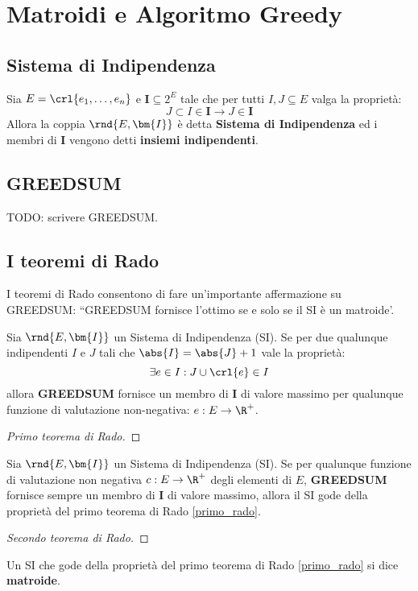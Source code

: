 \documentclass[\main/main.tex]{subfiles}
\begin{document}
\chapter{Matroidi e Algoritmo Greedy}
\section{Sistema di Indipendenza}
\begin{definition}
  Sia \(E = \crl{e_1, \ldots, e_n}\) e \(\bm{I} \subseteq 2^E\) tale che per tutti \(I, J \subseteq E\) valga la proprietà:
  \[
    J \subset I \in \bm{I} \rightarrow J \in \bm{I}
  \]
  Allora la coppia \(\rnd{E, \bm{I}}\) è detta \textbf{Sistema di Indipendenza} ed i membri di \(\bm{I}\) vengono detti \textbf{insiemi indipendenti}.
\end{definition}
\section{GREEDSUM}
TODO: scrivere GREEDSUM.
\section{I teoremi di Rado}
I teoremi di Rado consentono di fare un'importante affermazione su GREEDSUM: ``GREEDSUM fornisce l'ottimo se e solo se il SI è un matroide'.
\begin{theorem}
  Sia \(\rnd{E, \bm{I}}\) un Sistema di Indipendenza (SI). Se per due qualunque indipendenti \(I\) e \(J\) tali che \(\abs{I} = \abs{J} + 1\) vale la proprietà:
  \[
    \exists e \in I: J \cup \crl{e} \in I
  \]
  allora \textbf{GREEDSUM} fornisce un membro di \(\bm{I}\) di valore massimo per qualunque funzione di valutazione non-negativa: \(e: E \rightarrow \R^+\).
  \label{primo_rado}
\end{theorem}
\begin{proof}[Primo teorema di Rado]
\end{proof}
\begin{theorem}
  Sia \(\rnd{E, \bm{I}}\) un Sistema di Indipendenza (SI). Se per qualunque funzione di valutazione non negativa \(c: E \rightarrow \R^+\) degli elementi di \(E\), \textbf{GREEDSUM} fornisce sempre un membro di \(\bm{I}\) di valore massimo, allora il SI gode della proprietà del primo teorema di Rado \ref{primo_rado}.
\end{theorem}
\begin{proof}[Secondo teorema di Rado]
\end{proof}
\begin{definition}[Matroide]
  Un SI che gode della proprietà del primo teorema di Rado \ref{primo_rado} si dice \textbf{matroide}.
\end{definition}
\end{document}
